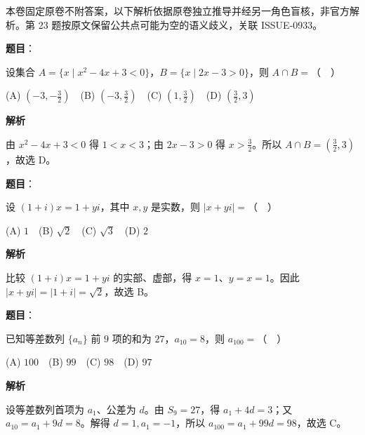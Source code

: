 

\begin{gktip}
本卷固定原卷不附答案，以下解析依据原卷独立推导并经另一角色盲核，非官方解析。第 23 题按原文保留公共点可能为空的语义歧义，关联 ISSUE-0933。
\end{gktip}


\begin{answer}

\textbf{题目}：

设集合 $A=\{x\mid x^2-4x+3<0\}$，$B=\{x\mid 2x-3>0\}$，则 $A\cap B=$（　）

   (A) $(-3,-\frac32)$　(B) $(-3,\frac32)$　(C) $(1,\frac32)$　(D) $(\frac32,3)$

\textbf{解析}

由 \(x^2-4x+3<0\) 得 \(1<x<3\)；由 \(2x-3>0\) 得 \(x>\frac32\)。所以 \(A\cap B=(\frac32,3)\)，故选 D。


\end{answer}
\begin{answer}

\textbf{题目}：

设 $(1+i)x=1+yi$，其中 $x,y$ 是实数，则 $|x+yi|=$（　）

   (A) $1$　(B) $\sqrt2$　(C) $\sqrt3$　(D) $2$

\textbf{解析}

比较 \((1+i)x=1+yi\) 的实部、虚部，得 \(x=1\)、\(y=x=1\)。因此 \(|x+yi|=|1+i|=\sqrt2\)，故选 B。


\end{answer}
\begin{answer}

\textbf{题目}：

已知等差数列 $\{a_n\}$ 前 $9$ 项的和为 $27$，$a_{10}=8$，则 $a_{100}=$（　）

   (A) $100$　(B) $99$　(C) $98$　(D) $97$

\textbf{解析}

设等差数列首项为 \(a_1\)、公差为 \(d\)。由 \(S_9=27\)，得 \(a_1+4d=3\)；又 \(a_{10}=a_1+9d=8\)。解得 \(d=1,a_1=-1\)，所以 \(a_{100}=a_1+99d=98\)，故选 C。


\end{answer}
